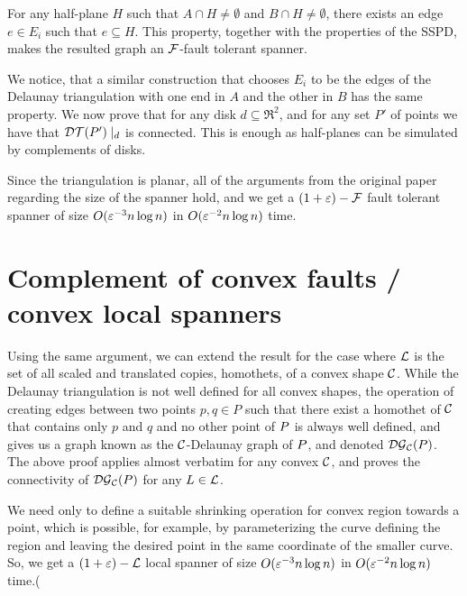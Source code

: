 \documentclass[12pt]{article}%
\begin{document}
For any half-plane $H$ such that $A\cap H\neq \emptyset$ and
$B\cap H\neq \emptyset$, there exists an edge $e\in E_i$ such that
$e\subseteq H$. This property, together with the properties of the
SSPD, makes the resulted graph an $\mathcal{F}$-fault tolerant spanner.

We notice, that a similar construction that chooses $E_i$ to be the
edges of the Delaunay triangulation with one end in $A$ and the other
in $B$ has the same property. We now prove that for any disk
$d\subseteq \Re^2$, and for any set $P'$ of points we have that
$\mathcal{DT}(P')\mid_d$ is connected. This is enough as half-planes can be
simulated by complements of disks.


Since the triangulation is planar, all of the arguments from the
original paper regarding the size of the spanner hold, and we get a
$(1+\varepsilon)-\mathcal{F}$ fault tolerant spanner of size $O(\varepsilon^{-3}n\log n)$ in
$O(\varepsilon^{-2}n\log n)$ time.


\section{Complement of convex faults / convex local spanners}
Using the same argument, we can extend the result for the case where
$\mathcal{L}$ is the set of all scaled and translated copies, homothets, of a
convex shape $\mathcal{C}$. While the Delaunay triangulation is not well
defined for all convex shapes, the operation of creating edges between
two points $p,q\in P$ such that there exist a homothet of $\mathcal{C}$ that
contains only $p$ and $q$ and no other point of $P$ is always well
defined, and gives us a graph known as the $\mathcal{C}$-Delaunay graph of
$P$, and denoted $\mathcal{DG}_{\mathcal{C}}(P)$. The above proof applies almost
verbatim for any convex $\mathcal{C}$, and proves the connectivity of
$\mathcal{DG}_{\mathcal{C}}(P)$ for any $L\in \mathcal{L}$.

We need only to define a suitable shrinking operation for convex
region towards a point, which is possible, for example, by
parameterizing the curve defining the region and leaving the desired
point in the same coordinate of the smaller curve. So, we get a
$(1+\varepsilon)-\mathcal{L}$ local spanner of size $O(\varepsilon^{-3}n\log n)$ in
$O(\varepsilon^{-2}n\log n)$ time.(


\end{document}
